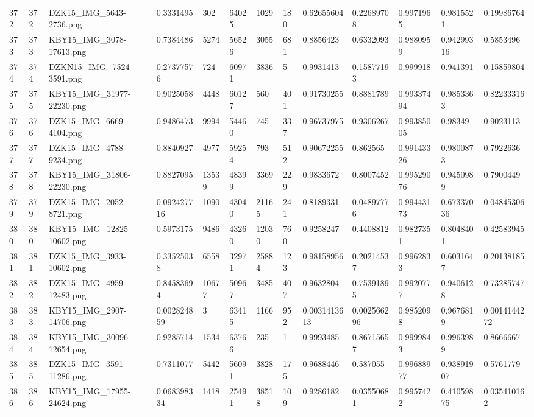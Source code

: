 \documentclass[11pt, a4paper, twoside]{report}
\begin{document}
\begin{longtable}[c]{@{}lllllllllllll@{}}
372 & 372 & DZK15\_IMG\_5643-2736.png & 0.3331495 & 302 & 64025 & 1029 & 180 & 0.62655604 & 0.22689708 & 0.9971965 & 0.9815521 & 0.19986764 \\
373 & 373 & KBY15\_IMG\_3078-17613.png & 0.7384486 & 5274 & 56526 & 3055 & 681 & 0.8856423 & 0.6332093 & 0.9880959 & 0.94299316 & 0.5853496 \\
374 & 374 & DZKN15\_IMG\_7524-3591.png & 0.27377576 & 724 & 60971 & 3836 & 5 & 0.9931413 & 0.15877193 & 0.999918 & 0.941391 & 0.15859804 \\
375 & 375 & KBY15\_IMG\_31977-22230.png & 0.9025058 & 4448 & 60127 & 560 & 401 & 0.91730255 & 0.8881789 & 0.99337494 & 0.9853363 & 0.82233316 \\
376 & 376 & DZK15\_IMG\_6669-4104.png & 0.9486473 & 9994 & 54460 & 745 & 337 & 0.96737975 & 0.9306267 & 0.99385005 & 0.98349 & 0.9023113 \\
377 & 377 & DZK15\_IMG\_4788-9234.png & 0.8840927 & 4977 & 59254 & 793 & 512 & 0.90672255 & 0.862565 & 0.99143326 & 0.9800873 & 0.7922636 \\
378 & 378 & KBY15\_IMG\_31806-22230.png & 0.8827095 & 13539 & 48399 & 3369 & 229 & 0.9833672 & 0.8007452 & 0.99529076 & 0.9450989 & 0.7900449 \\
379 & 379 & DZK15\_IMG\_2052-8721.png & 0.092427716 & 1090 & 43040 & 21165 & 241 & 0.8189331 & 0.04897776 & 0.99443173 & 0.67337036 & 0.04845306 \\
380 & 380 & KBY15\_IMG\_12825-10602.png & 0.5973175 & 9486 & 43260 & 12030 & 760 & 0.9258247 & 0.4408812 & 0.9827351 & 0.8048401 & 0.42583945 \\
381 & 381 & DZK15\_IMG\_3933-10602.png & 0.33525038 & 6558 & 32971 & 25884 & 123 & 0.98158956 & 0.20214537 & 0.9962833 & 0.6031647 & 0.20138185 \\
382 & 382 & DZK15\_IMG\_4959-12483.png & 0.84583694 & 10677 & 50967 & 3485 & 407 & 0.9632804 & 0.75391895 & 0.9920777 & 0.9406128 & 0.73285747 \\
383 & 383 & KBY15\_IMG\_2907-14706.png & 0.002824859 & 3 & 63415 & 1166 & 952 & 0.0031413613 & 0.002566296 & 0.9852098 & 0.9676819 & 0.0014144272 \\
384 & 384 & KBY15\_IMG\_30096-12654.png & 0.9285714 & 1534 & 63766 & 235 & 1 & 0.9993485 & 0.86715657 & 0.9999843 & 0.9963989 & 0.8666667 \\
385 & 385 & DZK15\_IMG\_3591-11286.png & 0.7311077 & 5442 & 56091 & 3828 & 175 & 0.9688446 & 0.587055 & 0.99688977 & 0.93891907 & 0.5761779 \\
386 & 386 & KBY15\_IMG\_17955-24624.png & 0.068398334 & 1418 & 25491 & 38518 & 109 & 0.9286182 & 0.03550681 & 0.9957422 & 0.41059875 & 0.035410162 \\

\end{longtable}
\end{document}
